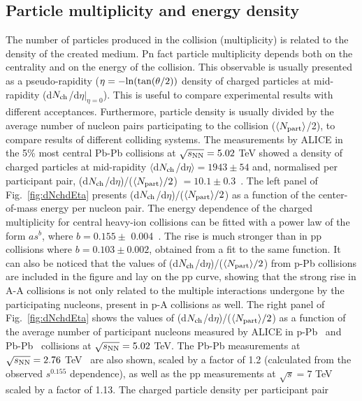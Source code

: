 \subsection{Particle multiplicity and energy density}
\label{sec:partMult}
The number of particles produced in the collision (multiplicity) is related to the 
density of the created medium. Pn fact particle multiplicity depends both on the 
centrality and on the energy of the collision. This observable is usually presented as 
a pseudo-rapidity ($\eta = - {\rm ln}(\tan(\theta/2))$ density of charged particles at 
mid-rapidity (d$N_{\rm ch}$/d$\eta |_{\eta=0}$). This is useful to compare experimental 
results with different acceptances. Furthermore, particle density is usually 
divided by the average number of nucleon pairs participating to the collision 
($\langle N_{\rm part}\rangle$/2), to compare results of different 
colliding systems. The measurements by ALICE in the 5\% 
most central Pb-Pb collisions at $\sqrt{s_{\rm NN}} = 5.02$ TeV showed a density of charged 
particles at mid-rapidity $\langle $d$N_{\rm ch}$/d$\eta \rangle = 1943 \pm 54$ 
and, normalised per participant pair, (d$N_{\rm ch}$/d$\eta$)/($\langle N_{\rm part} \rangle/2$) $ 
= 10.1 \pm 0.3$~\cite{Adam:2015ptt}.  
The left panel of Fig.~\ref{fig:dNchdEta} presents (d$N_{\rm ch}$/d$\eta$)/($\langle N_{\rm part} \rangle/2$) 
as a function of the center-of-mass energy per nucleon pair. The energy dependence 
of the charged multiplicity for central heavy-ion collisions can be fitted with a power 
law of the form $as^b$, where $b = 0.155 \pm$ 0.004~\cite{Adam:2015ptt}. 
The rise is much stronger than in pp collisions where $b = 0.103 \pm 0.002$, 
obtained from a fit to the same function. It can also be noticed that the values 
of (d$N_{\rm ch}$/d$\eta$)/($\langle N_{\rm part} \rangle/2$) from p-Pb collisions are included in the figure 
and lay on the pp curve, showing that the strong rise in A-A collisions is not 
only related to the multiple interactions undergone by the participating nucleons, 
present in p-A collisions as well. The right panel of Fig.~\ref{fig:dNchdEta} 
shows the values of (d$N_{\rm ch}$/d$\eta$)/($\langle N_{\rm part} \rangle/2$) 
as a function of the average number of participant nucleons 
measured by ALICE in p-Pb~\cite{ALICE:2012xs} and Pb-Pb~\cite{Adam:2015ptt} 
collisions at $\sqrt{s_{\rm NN}} = 5.02$ TeV. The Pb-Pb measurements at 
$\sqrt{s_{\rm NN}} = 2.76 $ TeV~\cite{Aamodt:2010cz} are also shown, scaled by a 
factor of 1.2 (calculated from the observed $s^{0.155}$ dependence), as 
well as the pp measurements at $\sqrt{s}= 7$ TeV~\cite{Adam:2015gka} 
scaled by a factor of 1.13. The charged particle density per participant pair 
